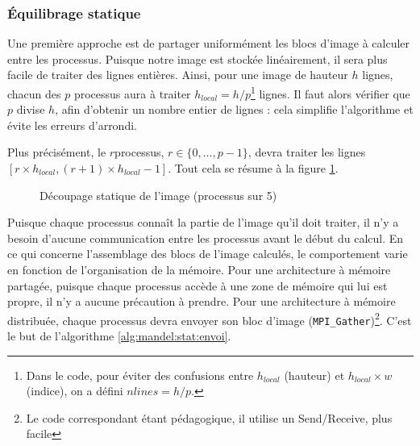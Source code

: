 \subsubsection{Équilibrage statique}

Une première approche est de partager uniformément les blocs d'image à
calculer entre les processus. Puisque notre image est stockée
linéairement, il sera plus facile de traiter des lignes
entières. Ainsi, pour une image de hauteur $h$ lignes, chacun des $p$
processus aura à traiter $h_{local} = h / p$\footnote{Dans le code,
  pour éviter des confusions entre $h_{local}$ (hauteur) et
  $h_{local} \times w$ (indice), on a défini $nlines = h / p$.}
lignes. Il faut alors vérifier que $p$ divise $h$, afin d'obtenir un
nombre entier de lignes : cela simplifie l'algorithme et évite les
erreurs d'arrondi.

Plus précisément, le $r$\ieme processus, $r \in \{0, \ldots, p-1\}$,
devra traiter les lignes
$[ r \times h_{local}, (r+1) \times h_{local} -1 ]$. Tout cela se
résume à la figure \ref{fig:mandel:decoupage-statique}.

\begin{figure}[h]
  \centering


  \caption{Découpage statique de l'i\-ma\-ge (processus  sur 5)}
  \label{fig:mandel:decoupage-statique}
\end{figure}

Puisque chaque processus connaît la partie de l'image qu'il doit
traiter, il n'y a besoin d'aucune communication entre les processus
avant le début du calcul. En ce qui concerne l'assemblage des blocs de
l'image calculés, le comportement varie en fonction de l'organisation
de la mémoire. Pour une architecture à mémoire partagée, puisque
chaque processus accède à une zone de mémoire qui lui est propre, il
n'y a aucune précaution à prendre. Pour une architecture à mémoire
distribuée, chaque processus devra envoyer son bloc d'image
(\texttt{MPI\_Gather})\footnote{Le code correspondant étant pédagogique,
  il utilise un Send/Receive, plus facile}. C'est le but de
l'algorithme \ref{alg:mandel:stat:envoi}.

